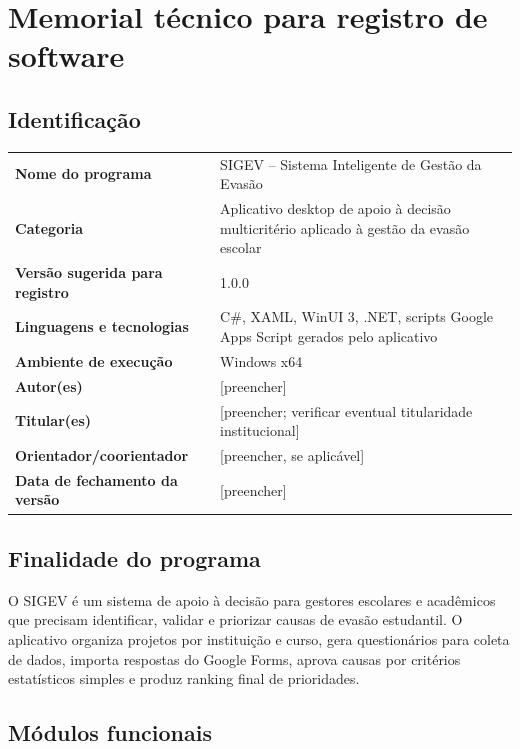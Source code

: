 \section{Memorial técnico para registro de software}

\subsection{Identificação}

\begin{longtable}{>{\bfseries}p{}p{}}
Nome do programa & SIGEV -- Sistema Inteligente de Gestão da Evasão \\
Categoria & Aplicativo desktop de apoio à decisão multicritério aplicado à gestão da evasão escolar \\
Versão sugerida para registro & 1.0.0 \\
Linguagens e tecnologias & C\#, XAML, WinUI 3, .NET, scripts Google Apps Script gerados pelo aplicativo \\
Ambiente de execução & Windows x64 \\
Autor(es) & [preencher] \\
Titular(es) & [preencher; verificar eventual titularidade institucional] \\
Orientador/coorientador & [preencher, se aplicável] \\
Data de fechamento da versão & [preencher] \\
\end{longtable}

\subsection{Finalidade do programa}

O SIGEV é um sistema de apoio à decisão para gestores escolares e acadêmicos que precisam identificar, validar e priorizar causas de evasão estudantil. O aplicativo organiza projetos por instituição e curso, gera questionários para coleta de dados, importa respostas do Google Forms, aprova causas por critérios estatísticos simples e produz ranking final de prioridades.

\subsection{Módulos funcionais}

